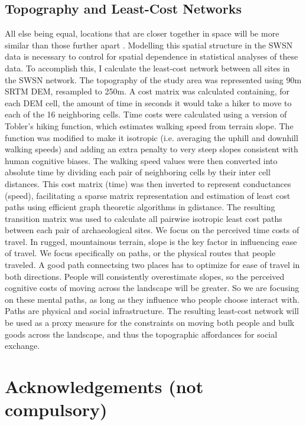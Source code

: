 \documentclass[11pt]{wlscirep}
\begin{document}
\subsection*{Topography and Least-Cost Networks}
All else being equal, locations that are closer together in space will be more similar than those further apart \cite{Tobler1970}. Modelling this spatial structure in the SWSN data is necessary to control for spatial dependence in statistical analyses of these data. To accomplish this, I calculate the least-cost network between all sites in the SWSN network. The topography of the study area was represented using 90m SRTM DEM, resampled to 250m. A cost matrix was calculated containing, for each DEM cell, the amount of time in seconds it would take a hiker to move to each of the 16 neighboring cells. Time costs were calculated using a version of Tobler's hiking function, which estimates walking speed from terrain slope. The function was modified to make it isotropic (i.e. averaging the uphill and downhill walking speeds) and adding an extra penalty to very steep slopes consistent with human cognitive biases. The walking speed values were then converted into absolute time by dividing each pair of neighboring cells by their inter cell distances. This cost matrix (time) was then inverted to represent conductances (speed), facilitating a sparse matrix representation and estimation of least cost paths using efficient graph theoretic algorithms in gdistance. The resulting transition matrix was used to calculate all pairwise isotropic least cost paths between each pair of archaeological sites. We focus on the perceived time costs of travel. In rugged, mountainous terrain, slope is the key factor in influencing ease of travel. We focus specifically on paths, or the physical routes that people traveled. A good path connectsing two places has to optimize for ease of travel in both directions. People will consistently overestimate slopes, so the perceived cognitive costs of moving across the landscape will be greater. So we are focusing on these mental paths, as long as they influence who people choose interact with. Paths are physical and social infrastructure. The resulting least-cost network will be used as a proxy measure for the constraints on moving both people and bulk goods across the landscape, and thus the topographic affordances for social exchange.




\section*{Acknowledgements (not compulsory)}
\end{document}

